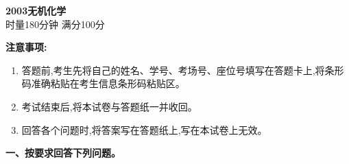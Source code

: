 \begin{center}
    {\LARGE \textbf{2003无机化学}} \\[2ex]
    {\large 时量180分钟 \quad 满分100分}
\end{center}

\vspace{0.5cm}
\noindent\textbf{注意事项:}
\begin{enumerate}[label=\arabic*., parsep=0pt, itemsep=0pt]
    \item 答题前,考生先将自己的姓名、学号、考场号、座位号填写在答题卡上,将条形码准确粘贴在考生信息条形码粘贴区。
    \item 考试结束后,将本试卷与答题纸一并收回。
    \item 回答各个问题时,将答案写在答题纸上,写在本试卷上无效。
\end{enumerate}

\vspace{0.5cm}
\noindent\textbf{一、按要求回答下列问题。}

